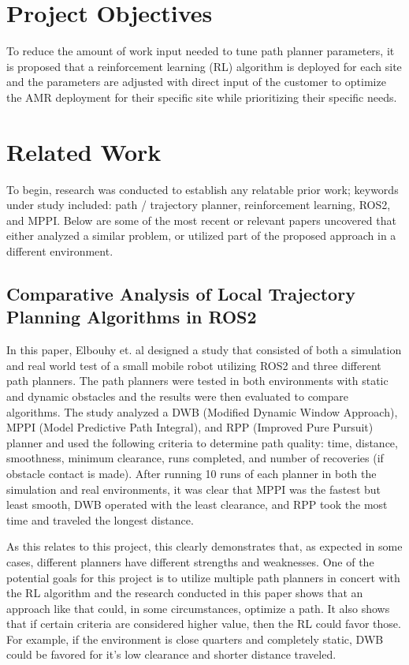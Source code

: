 \documentclass[conference]{IEEEtran}
\begin{document}
\section{Project Objectives}
To reduce the amount of work input needed to tune path planner parameters, it is proposed that a reinforcement learning (RL) algorithm is deployed for each site and the parameters are adjusted with direct input of the customer to optimize the AMR deployment for their specific site while prioritizing their specific needs. 

\section{Related Work}
    To begin, research was conducted to establish any relatable prior work; keywords under study included: path / trajectory planner, reinforcement learning, ROS2, and MPPI. Below are some of the most recent or relevant papers uncovered that either analyzed a similar problem, or utilized part of the proposed approach in a different environment.
        
        \subsection{Comparative Analysis of Local Trajectory Planning Algorithms in ROS2 \cite{b1}}
        In this paper, Elbouhy et. al designed a study that consisted of both a simulation and real world test of a small mobile robot utilizing ROS2 and three different path planners. The path planners were tested in both environments with static and dynamic obstacles and the results were then evaluated to compare algorithms. The study analyzed a DWB (Modified Dynamic Window Approach), MPPI (Model Predictive Path Integral), and RPP (Improved Pure Pursuit) planner and used the following criteria to determine path quality: time, distance, smoothness, minimum clearance, runs completed, and number of recoveries (if obstacle contact is made). After running 10 runs of each planner in both the simulation and real environments, it was clear that MPPI was the fastest but least smooth, DWB operated with the least clearance, and RPP took the most time and traveled the longest distance.

        As this relates to this project, this clearly demonstrates that, as expected in some cases, different planners have different strengths and weaknesses. One of the potential goals for this project is to utilize multiple path planners in concert with the RL algorithm and the research conducted in this paper shows that an approach like that could, in some circumstances, optimize a path. It also shows that if certain criteria are considered higher value, then the RL could favor those. For example, if the environment is close quarters and completely static, DWB could be favored for it's low clearance and shorter distance traveled.
\end{document}
